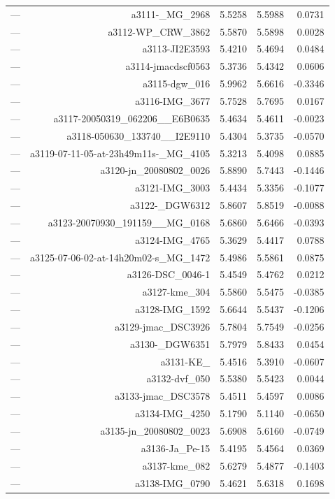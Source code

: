 \begin{table}[htbp]
\begin{tabular}{lrrrr}
— & a3111-_MG_2968 & 5.5258 & 5.5988 & 0.0731 \\
— & a3112-WP_CRW_3862 & 5.5870 & 5.5898 & 0.0028 \\
— & a3113-JI2E3593 & 5.4210 & 5.4694 & 0.0484 \\
— & a3114-jmacdscf0563 & 5.3736 & 5.4342 & 0.0606 \\
— & a3115-dgw_016 & 5.9962 & 5.6616 & -0.3346 \\
— & a3116-IMG_3677 & 5.7528 & 5.7695 & 0.0167 \\
— & a3117-20050319_062206__E6B0635 & 5.4634 & 5.4611 & -0.0023 \\
— & a3118-050630_133740__I2E9110 & 5.4304 & 5.3735 & -0.0570 \\
— & a3119-07-11-05-at-23h49m11s-_MG_4105 & 5.3213 & 5.4098 & 0.0885 \\
— & a3120-jn_20080802_0026 & 5.8890 & 5.7443 & -0.1446 \\
— & a3121-IMG_3003 & 5.4434 & 5.3356 & -0.1077 \\
— & a3122-_DGW6312 & 5.8607 & 5.8519 & -0.0088 \\
— & a3123-20070930_191159__MG_0168 & 5.6860 & 5.6466 & -0.0393 \\
— & a3124-IMG_4765 & 5.3629 & 5.4417 & 0.0788 \\
— & a3125-07-06-02-at-14h20m02-s_MG_1472 & 5.4986 & 5.5861 & 0.0875 \\
— & a3126-DSC_0046-1 & 5.4549 & 5.4762 & 0.0212 \\
— & a3127-kme_304 & 5.5860 & 5.5475 & -0.0385 \\
— & a3128-IMG_1592 & 5.6644 & 5.5437 & -0.1206 \\
— & a3129-jmac_DSC3926 & 5.7804 & 5.7549 & -0.0256 \\
— & a3130-_DGW6351 & 5.7979 & 5.8433 & 0.0454 \\
— & a3131-KE_ & 5.4516 & 5.3910 & -0.0607 \\
— & a3132-dvf_050 & 5.5380 & 5.5423 & 0.0044 \\
— & a3133-jmac_DSC3578 & 5.4511 & 5.4597 & 0.0086 \\
— & a3134-IMG_4250 & 5.1790 & 5.1140 & -0.0650 \\
— & a3135-jn_20080802_0023 & 5.6908 & 5.6160 & -0.0749 \\
— & a3136-Ja_Pe-15 & 5.4195 & 5.4564 & 0.0369 \\
— & a3137-kme_082 & 5.6279 & 5.4877 & -0.1403 \\
— & a3138-IMG_0790 & 5.4621 & 5.6318 & 0.1698 \\

\end{tabular}
\end{table}
